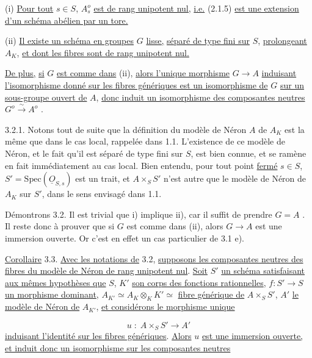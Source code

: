(i) \underline{Pour tout} $s \in S$, $A_s^o$ \underline{est de rang unipotent nul,} \underline{i.e.} (2.1.5) \underline{est une extension d'un schéma abélien par un tore.}

(ii) \underline{Il existe un schéma en groupes} $G$ \underline{lisse,} \underline{séparé de type fini sur} $S$, \underline{prolongeant} $A_K$, \underline{et dont les fibres sont de rang unipotent nul.}

\underline{De plus,} \underline{si} $G$ \underline{est comme dans} (ii), \underline{alors l'unique morphisme} $G \longrightarrow A$ \underline{induisant l'isomorphisme donné sur les fibres génériques est un isomorphisme de} $G$ \underline{sur un sous-groupe ouvert de} $A$, \underline{donc induit un isomorphisme des composantes neutres} $G^o \xrightarrow{\sim} A^o$ .



3.2.1. Notons tout de suite que la définition du modèle de Néron $A$ de $A_K$ est la même que dans le cas local, rappelée dans 1.1. L'existence de ce modèle de Néron, et le fait qu'il est séparé de type fini sur $S$, est bien connue, et se ramène en fait immédiatement au cas local. Bien entendu, pour tout point \underline{fermé} $s \in S$, $S' = \mathrm{Spec}(\underline{O}_{S,s})$ est un trait, et $A \times_S S'$ n'est autre que le modèle de Néron de $A_K$ sur $S'$, dans le sens envisagé dans 1.1.

Démontrons 3.2. Il est trivial que i) implique ii), car il suffit de prendre $G = A$ . Il reste donc à prouver que si $G$ est comme dans (ii), alors $G \longrightarrow A$ est une immersion ouverte. Or c'est en effet un cas particulier de 3.1 e).

\underline{Corollaire} 3.3. \underline{Avec les notations de} 3.2, \underline{supposons les composantes neutres des fibres du modèle de Néron de rang unipotent nul}. \underline{Soit} $S'$ \underline{un schéma satisfaisant aux mêmes hypothèses que} $S$, $K'$ \underline{son corps des fonctions rationnelles}, $f: S' \longrightarrow S$ \underline{un morphisme dominant}, $A_{K'} \simeq A_K \otimes_K K' \simeq$ \underline{fibre générique de} $A \times_S S'$, $A'$ \underline{le modèle de Néron de} $A_{K'}$, \underline{et considérons le morphisme unique}

\begin{equation*}
u \; : \; A \times_S S' \longrightarrow A'
\end{equation*}
\underline{induisant l'identité sur les fibres génériques}. \underline{Alors} $u$ \underline{est une immersion ouverte,} \underline{et induit donc un isomorphisme sur les composantes neutres}

